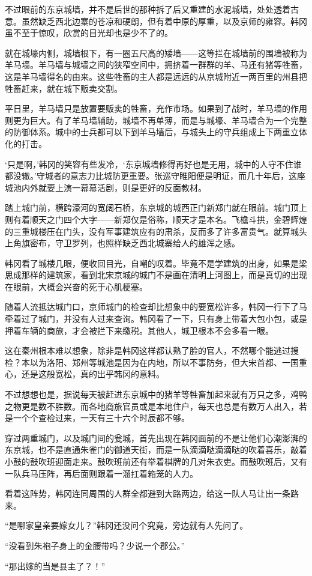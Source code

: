不过眼前的东京城墙，并不是后世的那种拆了后又重建的水泥城墙，处处透着古意。虽然缺乏西北边寨的苍凉和硬朗，但有着中原的厚重，以及京师的雍容。韩冈虽不至于惊叹，欣赏的目光却也是少不了的。

就在城壕内侧，城墙根下，有一圈五尺高的矮墙——这等拦在城墙前的围墙被称为羊马墙。羊马墙与城墙之间的狭窄空间中，拥挤着一群群的羊、马还有猪等牲畜，这是羊马墙得名的由来。这些牲畜的主人都是远远的从京城附近一两百里的州县把牲畜赶来，就在城下贩卖交割。

平日里，羊马墙只是放置要贩卖的牲畜，充作市场。如果到了战时，羊马墙的作用则更为巨大。有了羊马墙辅助，城墙不再单薄，而是与城壕、羊马墙合为一个完整的防御体系。城中的士兵都可以下到羊马墙后，与城头上的守兵组成上下两重立体化的打击。

‘只是啊，’韩冈的笑容有些发冷，‘东京城墙修得再好也是无用，城中的人守不住谁都没辙。’守城者的意志力比城防更重要。张巡守睢阳便是明证，而几十年后，这座城池内外就要上演一幕幕活剧，则是更好的反面教材。

踏上城门前，横跨濠河的宽阔石桥，东京城的城西正门新郑门就在眼前。城门顶上则有着顺天之门四个大字——新郑仅是俗称，顺天才是本名。飞檐斗拱，金碧辉煌的三重城楼压在门头，没有军事建筑应有的肃杀，反而多了许多富贵气。就算城头上角旗密布，守卫罗列，也照样缺乏西北城寨给人的雄浑之感。

韩冈看了城楼几眼，便收回目光，自嘲的叹着。毕竟不是学建筑的出身，如果是梁思成那样的建筑家，看到北宋京城的城门不是画在清明上河图上，而是真切的出现在眼前，大概会兴奋的死于心肌梗塞。

随着人流抵达城门口，京师城门的检查却比想象中的要宽松许多，韩冈一行下了马牵着过了城门，并没有人过来查询。韩冈看了一下，只有身上带着大包小包，或是押着车辆的商旅，才会被拦下来缴税。其他人，城卫根本不会多看一眼。

这在秦州根本难以想象，除非是韩冈这样都认熟了脸的官人，不然哪个能逃过搜检？本以为洛阳、郑州等城池是因为在内地，所以不事防务，但大宋首都、一国重心，还是这般宽松，真的出乎韩冈的意料。

不过想想也是，据说每天被赶进东京城中的猪羊等牲畜加起来就有万只之多，鸡鸭之物更是数不胜数。而各地商旅官员或是本地住户，每天也总是有数万人出入，若是一个个查检过来，一天有三十六个时辰都不够。

穿过两重城门，以及城门间的瓮城，首先出现在韩冈面前的不是让他们心潮澎湃的东京城，也不是直通朱雀门的御道天街，而是一队滴滴哒滴滴哒的吹着喜乐，敲着小鼓的鼓吹班迎面走来。鼓吹班前还有举着棋牌的几对朱衣吏。而鼓吹班后，又有一队兵马压阵，再后面则跟着一溜扛着箱笼的人力。

看着这阵势，韩冈连同周围的人群全都避到大路两边，给这一队人马让出一条路来。

“是哪家皇亲要嫁女儿？”韩冈还没问个究竟，旁边就有人先问了。

“没看到朱袍子身上的金腰带吗？少说一个郡公。”

“那出嫁的当是县主了？！”

